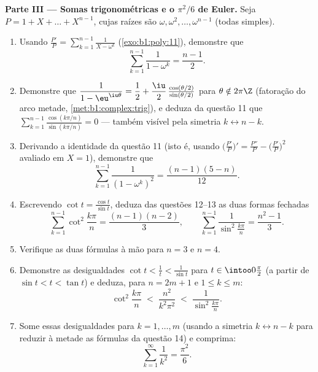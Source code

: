 \begin{problem}
\medskip
\noindent\textbf{Parte III --- Somas trigonométricas e o
$\pi^2/6$ de Euler.} Seja $P = 1 + X + \dots + X^{n-1}$, cujas raízes são
$\omega, \omega^2, \dots, \omega^{n-1}$ (todas simples).
\begin{enumerate}
  \item Usando $\frac{P'}P = \sum_{k=1}^{n-1}\frac1{X - \omega^k}$
        (\cref{exo:b1:poly:11}), demonstre que
        \[
        \sum_{k=1}^{n-1}\frac{1}{1 - \omega^k} = \frac{n-1}2 .
        \]
  \item Demonstre que $\dfrac1{1 - \eu^{\iu\theta}} = \dfrac12 +
        \dfrac\iu2\,\frac{\cos(\theta/2)}{\sin(\theta/2)}$ para
        $\theta \notin 2\pi\Z$ (fatoração do arco metade,
        \cref{met:b1:complex:trig}), e deduza da questão 11
        que $\sum_{k=1}^{n-1}
        \frac{\cos(k\pi/n)}{\sin(k\pi/n)} = 0$ --- também visível
        pela simetria $k \leftrightarrow n - k$.
  \item Derivando a identidade da questão 11 (isto é, usando
        $\bigl(\frac{P'}P\bigr)' = \frac{P''}P -
        \bigl(\frac{P'}P\bigr)^2$ avaliado em $X = 1$), demonstre que
        \[
        \sum_{k=1}^{n-1}\frac{1}{(1 - \omega^k)^2}
        = \frac{(n-1)(5-n)}{12} .
        \]
  \item Escrevendo $\cot t = \frac{\cos t}{\sin t}$, deduza das
        questões 12--13 as duas formas fechadas
        \[
        \sum_{k=1}^{n-1}\cot^2\frac{k\pi}n = \frac{(n-1)(n-2)}3,
        \qquad
        \sum_{k=1}^{n-1}\frac1{\sin^2\frac{k\pi}n}
        = \frac{n^2-1}3 .
        \]
  \item Verifique as duas fórmulas à mão para $n = 3$ e $n = 4$.
  \item Demonstre as desigualdades $\cot t < \frac1t < \frac1{\sin t}$
        para $t \in \intoo0{\frac\pi2}$ (a partir de $\sin t < t < \tan
        t$) e deduza, para $n = 2m + 1$ e $1 \leq k \leq m$:
        \[
        \cot^2\frac{k\pi}n \;<\; \frac{n^2}{k^2\pi^2}
        \;<\; \frac1{\sin^2\frac{k\pi}n} .
        \]
  \item Some essas desigualdades para $k = 1, \dots, m$ (usando a
        simetria $k \leftrightarrow n - k$ para reduzir à metade as fórmulas
        da questão 14) e comprima:
        \[
        \sum_{k=1}^{\infty}\frac1{k^2} = \frac{\pi^2}6 .
        \]
\end{enumerate}


\end{problem}
